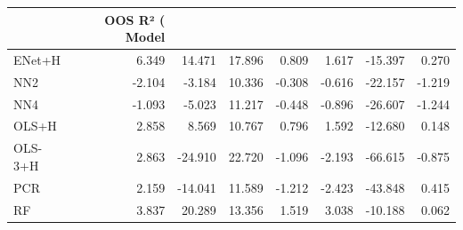\begin{tabular}{lrrrrrrr}
\toprule
 & OOS R² (%
Model &  &  &  &  &  &  &  \\
\midrule
ENet+H & 6.349 & 14.471 & 17.896 & 0.809 & 1.617 & -15.397 & 0.270 \\
NN2 & -2.104 & -3.184 & 10.336 & -0.308 & -0.616 & -22.157 & -1.219 \\
NN4 & -1.093 & -5.023 & 11.217 & -0.448 & -0.896 & -26.607 & -1.244 \\
OLS+H & 2.858 & 8.569 & 10.767 & 0.796 & 1.592 & -12.680 & 0.148 \\
OLS-3+H & 2.863 & -24.910 & 22.720 & -1.096 & -2.193 & -66.615 & -0.875 \\
PCR & 2.159 & -14.041 & 11.589 & -1.212 & -2.423 & -43.848 & 0.415 \\
RF & 3.837 & 20.289 & 13.356 & 1.519 & 3.038 & -10.188 & 0.062 \\
\bottomrule
\end{tabular}

